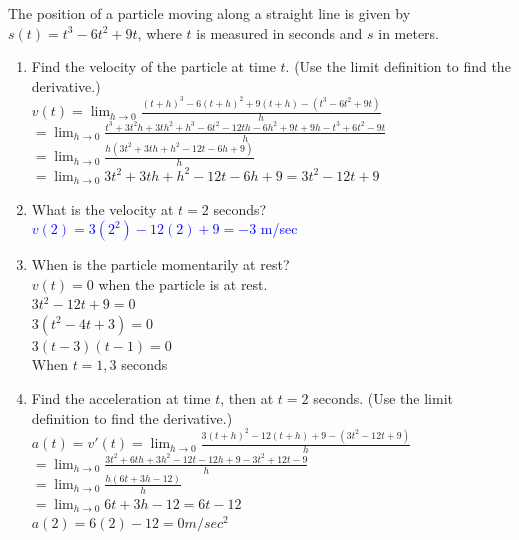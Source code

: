 \documentclass{ximera}
\begin{document}
\begin{exercise}
    The position of a particle moving along a straight line is given by $s(t)=t^3-6t^2+9t$, where $t$ is measured in seconds and $s$ in meters.
    \begin{enumerate}
        \item Find the velocity of the particle at time $t$. (Use the limit definition to find the derivative.)\\
            $v(t)=\lim_{h\rightarrow 0}\frac{(t+h)^3-6(t+h)^2+9(t+h)-(t^3-6t^2+9t)}{h}$\\
        $=\lim_{h\rightarrow 0}\frac{t^3+3t^2h+3th^2+h^3-6t^2-12th-6h^2+9t+9h-t^3+6t^2-9t}{h}$\\
        $=\lim_{h\rightarrow 0}\frac{h(3t^2+3th+h^2-12t-6h+9)}{h}$\\
        $=\lim_{h\rightarrow 0}3t^2+3th+h^2-12t-6h+9=3t^2-12t+9$%
        \item What is the velocity at $t=2$ seconds?\\
        \textcolor{blue}{$v(2)=3(2^2)-12(2)+9=-3$ m/sec}
        \item When is the particle momentarily at rest? \\
             $v(t)=0$ when the particle is at rest.\\
        $3t^2-12t+9=0$\\
        $3(t^2-4t+3)=0$\\
        $3(t-3)(t-1)=0$\\
        When $t=1,3$ seconds%
        \item Find the acceleration at time $t$, then at $t=2$ seconds. (Use the limit definition to find the derivative.)\\
        $a(t)=v'(t)=\lim_{h\rightarrow 0}\frac{3(t+h)^2-12(t+h)+9-(3t^2-12t+9)}{h}$\\
        $=\lim_{h\rightarrow 0}\frac{3t^2+6th+3h^2-12t-12h+9-3t^2+12t-9}{h}$\\
        $=\lim_{h\rightarrow 0}\frac{h(6t+3h-12)}{h}$\\
        $=\lim_{h\rightarrow 0} 6t+3h-12=6t-12$\\
        $a(2)=6(2)-12=0 m/sec^2$%
    \end{enumerate}
\end{exercise}
\end{document}
